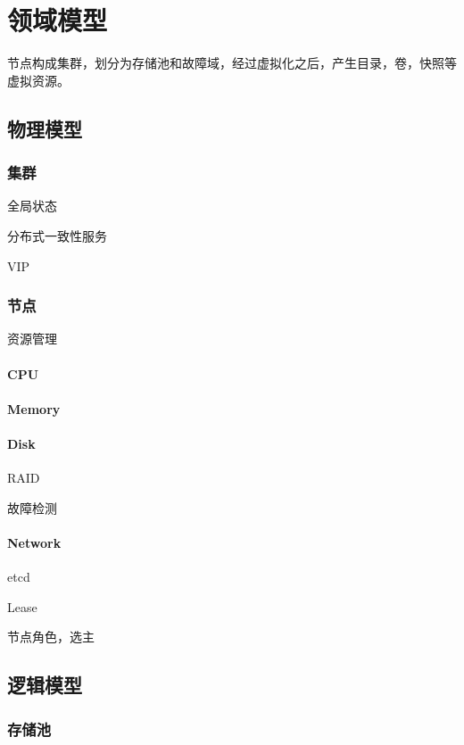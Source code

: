 \chapter{领域模型}

节点构成集群，划分为存储池和故障域，经过虚拟化之后，产生目录，卷，快照等虚拟资源。

\section{物理模型}

\subsection{集群}

全局状态

分布式一致性服务

VIP

\subsection{节点}

资源管理

\subsubsection{CPU}

\subsubsection{Memory}
\subsubsection{Disk}

RAID

故障检测

\subsubsection{Network}

etcd

Lease

节点角色，选主


\section{逻辑模型}

\subsection{存储池}

